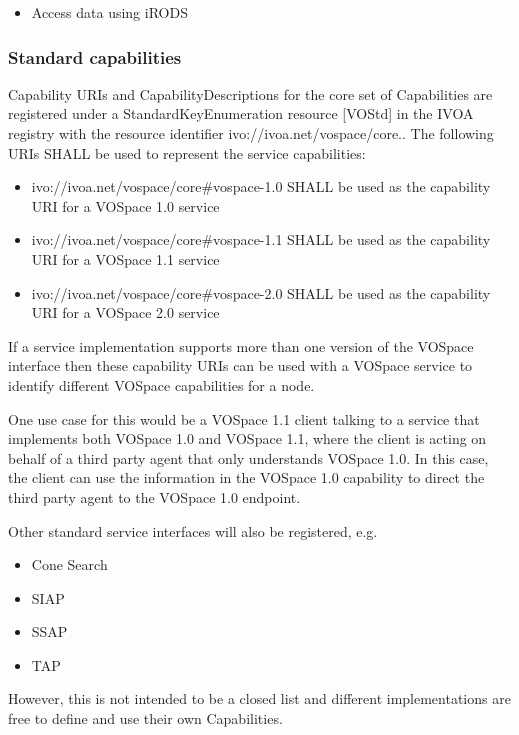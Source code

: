\documentclass[11pt,a4paper]{ivoa}
\begin{document}
\begin{itemize}
    \item Access data using iRODS
\end{itemize}

\subsubsection{Standard capabilities}
Capability URIs and CapabilityDescriptions for the core set of Capabilities are registered under a StandardKeyEnumeration resource [VOStd] in the IVOA registry with the resource identifier ivo://ivoa.net/vospace/core.. The following URIs SHALL be used to represent the service capabilities:

\begin{itemize}
    \item ivo://ivoa.net/vospace/core\#vospace-1.0 SHALL be used as the capability URI for a VOSpace 1.0 service
    \item ivo://ivoa.net/vospace/core\#vospace-1.1 SHALL be used as the capability URI for a VOSpace 1.1 service
    \item ivo://ivoa.net/vospace/core\#vospace-2.0 SHALL be used as the capability URI for a VOSpace 2.0 service
\end{itemize}
If a service implementation supports more than one version of the VOSpace interface then these capability URIs can be used with a VOSpace service to identify different VOSpace capabilities for a node.

One use case for this would be a VOSpace 1.1 client talking to a service that implements both VOSpace 1.0 and VOSpace 1.1, where the client is acting on behalf of a third party agent that only understands VOSpace 1.0. In this case, the client can use the information in the VOSpace 1.0 capability to direct the third party agent to the VOSpace 1.0 endpoint.

Other standard service interfaces will also be registered, e.g.

\begin{itemize}
    \item Cone Search
    \item SIAP
    \item SSAP
    \item TAP
\end{itemize}

However, this is not intended to be a closed list and different implementations are free to define and use their own Capabilities.
\end{document}
